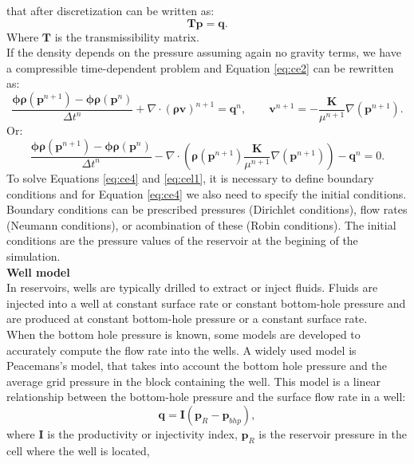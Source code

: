 \documentclass[12pt]{article}
\numberwithin{equation}{section}
\begin{document}
that after discretization can be written as:
 \begin{equation}\label{eq:cel1}
\mathbf{T}\mathbf{p} = \mathbf{q}.
\end{equation}
Where $\mathbf{T}$ is the transmissibility matrix.\\
If the density depends on the pressure assuming again no gravity terms, we have a compressible time-dependent problem and Equation \eqref{eq:ce2}
can be rewritten as:
\begin{equation}\label{eq:ce3}
 \frac{\mathbf{\phi}\mathbf{\rho}(\mathbf{p}^{n+1})
 -\mathbf{\phi}\mathbf{\rho}(\mathbf{p}^{n})}{\Delta t^n}
 +\nabla \cdot (\mathbf{\rho} \mathbf{v})^{n+1}=\mathbf{q}^{n},
\qquad
\mathbf{v}^{n+1}= -\frac{\mathbf{K}}{\mu^{n+1}}\nabla(\mathbf{p}^{n+1}).
\end{equation}
Or:
\begin{equation}\label{eq:ce4}
 \frac{\mathbf{\phi}\mathbf{\rho}(\mathbf{p}^{n+1})
 -\mathbf{\phi}\mathbf{\rho}(\mathbf{p}^{n})}{\Delta t^n}
 -\nabla \cdot (\mathbf{\rho}(\mathbf{p}^{n+1}) 
 \frac{\mathbf{K}}{\mu^{n+1}}\nabla(\mathbf{p}^{n+1}))-\mathbf{q}^{n}=0.
\end{equation}
To solve Equations \eqref{eq:ce4} and \eqref{eq:cel1}, it is necessary to define boundary conditions and for Equation \eqref{eq:ce4} we also need to specify the initial conditions.  Boundary conditions can be prescribed pressures (Dirichlet conditions),  flow rates (Neumann conditions),  or acombination of these (Robin conditions). The initial conditions are the pressure values of the reservoir at the begining of the simulation.\\
\textbf{Well model}\\
In reservoirs, wells are typically drilled to extract or inject fluids. Fluids are injected into a well at constant surface rate or constant bottom-hole pressure and are produced at constant bottom-hole pressure or a constant surface rate.\\
 When the bottom hole pressure is known, some models are developed to accurately compute the flow rate into the wells.  A widely used model is Peacemans's model, that takes into account the bottom hole pressure and the average grid pressure in the block containing the well. 
This model is a linear relationship between the bottom-hole pressure and the surface flow rate in a well:
\begin{equation}\label{eq:wellm}
\mathbf{q}=\mathbf{I}(\mathbf{p}_R-\mathbf{p}_{bhp}),
\end{equation}
where $\mathbf{I}$ is the productivity or injectivity index, $\mathbf{p}_{R}$ is the reservoir pressure in the cell where the well is located, 
\end{document}
